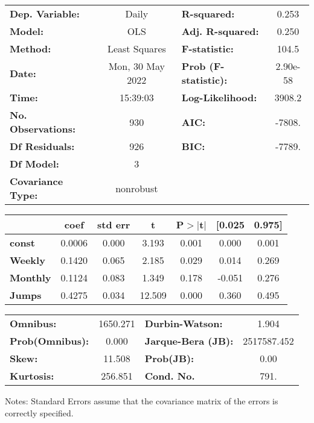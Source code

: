 \begin{center}
\begin{tabular}{lclc}
\toprule
\textbf{Dep. Variable:}    &      Daily       & \textbf{  R-squared:         } &      0.253   \\
\textbf{Model:}            &       OLS        & \textbf{  Adj. R-squared:    } &      0.250   \\
\textbf{Method:}           &  Least Squares   & \textbf{  F-statistic:       } &      104.5   \\
\textbf{Date:}             & Mon, 30 May 2022 & \textbf{  Prob (F-statistic):} &   2.90e-58   \\
\textbf{Time:}             &     15:39:03     & \textbf{  Log-Likelihood:    } &     3908.2   \\
\textbf{No. Observations:} &         930      & \textbf{  AIC:               } &     -7808.   \\
\textbf{Df Residuals:}     &         926      & \textbf{  BIC:               } &     -7789.   \\
\textbf{Df Model:}         &           3      & \textbf{                     } &              \\
\textbf{Covariance Type:}  &    nonrobust     & \textbf{                     } &              \\
\bottomrule
\end{tabular}
\begin{tabular}{lcccccc}
                 & \textbf{coef} & \textbf{std err} & \textbf{t} & \textbf{P$> |$t$|$} & \textbf{[0.025} & \textbf{0.975]}  \\
\midrule
\textbf{const}   &       0.0006  &        0.000     &     3.193  &         0.001        &        0.000    &        0.001     \\
\textbf{Weekly}  &       0.1420  &        0.065     &     2.185  &         0.029        &        0.014    &        0.269     \\
\textbf{Monthly} &       0.1124  &        0.083     &     1.349  &         0.178        &       -0.051    &        0.276     \\
\textbf{Jumps}   &       0.4275  &        0.034     &    12.509  &         0.000        &        0.360    &        0.495     \\
\bottomrule
\end{tabular}
\begin{tabular}{lclc}
\textbf{Omnibus:}       & 1650.271 & \textbf{  Durbin-Watson:     } &      1.904   \\
\textbf{Prob(Omnibus):} &   0.000  & \textbf{  Jarque-Bera (JB):  } & 2517587.452  \\
\textbf{Skew:}          &  11.508  & \textbf{  Prob(JB):          } &       0.00   \\
\textbf{Kurtosis:}      & 256.851  & \textbf{  Cond. No.          } &       791.   \\
\bottomrule
\end{tabular}
\end{center}

Notes: \newline
 [1] Standard Errors assume that the covariance matrix of the errors is correctly specified.